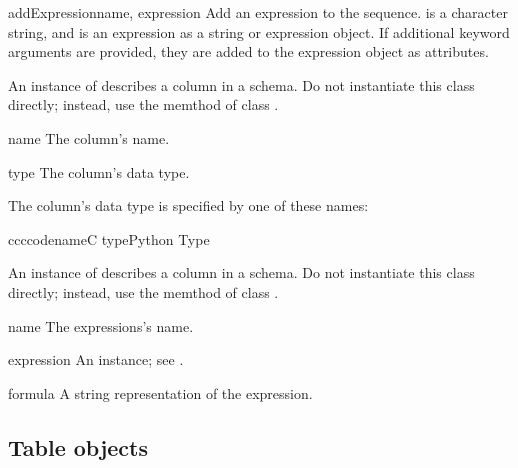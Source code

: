 \begin{methoddesc}{addExpression}{name, expression}
 Add an expression to the sequence.   is a character string,
 and  is an expression as a string or expression object.
 If additional keyword arguments are provided, they are added to the
 expression object as attributes.
\end{methoddesc}

An instance of  describes a column in a schema.
Do not instantiate this class directly; instead, use the
 memthod of class .

\begin{memberdesc}{name}
 \readonly The column's name.
\end{memberdesc}

\begin{memberdesc}{type}
 \readonly The column's data type.
\end{memberdesc}

The column's data type is specified by one of these names:
\begin{tableiii}{ccc}{code}{name}{C type}{Python Type}
\end{tableiii}


An instance of  describes a column in a
schema.  Do not instantiate this class directly; instead, use the
 memthod of class .

\begin{memberdesc}{name}
 \readonly The expressions's name.
\end{memberdesc}

\begin{memberdesc}{expression}
 \readonly An  instance; see .
\end{memberdesc}

\begin{memberdesc}{formula}
 \readonly A string representation of the expression.
\end{memberdesc}



\subsection{Table objects}

